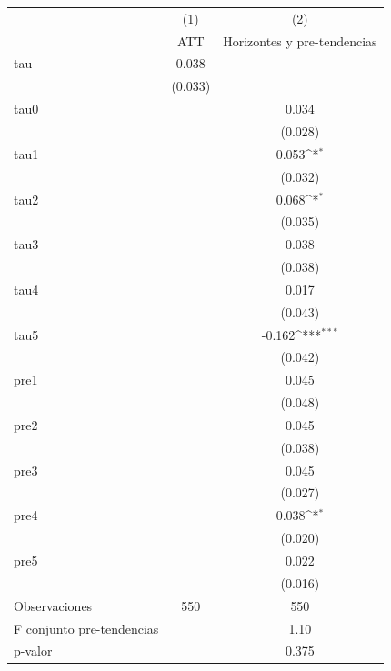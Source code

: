 {
\def\sym#1{\ifmmode^{#1}\else\(^{#1}\)\fi}
\begin{tabular}{l*{2}{c}}
\toprule
            &\multicolumn{1}{c}{(1)}&\multicolumn{1}{c}{(2)}\\
            &\multicolumn{1}{c}{ATT}&\multicolumn{1}{c}{Horizontes y pre-tendencias}\\
\midrule
tau         &       0.038         &                     \\
            &     (0.033)         &                     \\
\addlinespace
tau0        &                     &       0.034         \\
            &                     &     (0.028)         \\
\addlinespace
tau1        &                     &       0.053\sym{*}  \\
            &                     &     (0.032)         \\
\addlinespace
tau2        &                     &       0.068\sym{*}  \\
            &                     &     (0.035)         \\
\addlinespace
tau3        &                     &       0.038         \\
            &                     &     (0.038)         \\
\addlinespace
tau4        &                     &       0.017         \\
            &                     &     (0.043)         \\
\addlinespace
tau5        &                     &      -0.162\sym{***}\\
            &                     &     (0.042)         \\
\addlinespace
pre1        &                     &       0.045         \\
            &                     &     (0.048)         \\
\addlinespace
pre2        &                     &       0.045         \\
            &                     &     (0.038)         \\
\addlinespace
pre3        &                     &       0.045         \\
            &                     &     (0.027)         \\
\addlinespace
pre4        &                     &       0.038\sym{*}  \\
            &                     &     (0.020)         \\
\addlinespace
pre5        &                     &       0.022         \\
            &                     &     (0.016)         \\
\midrule
Observaciones&         550         &         550         \\
F conjunto pre-tendencias&                     &        1.10         \\
p-valor     &                     &       0.375         \\
\bottomrule
\end{tabular}
}
